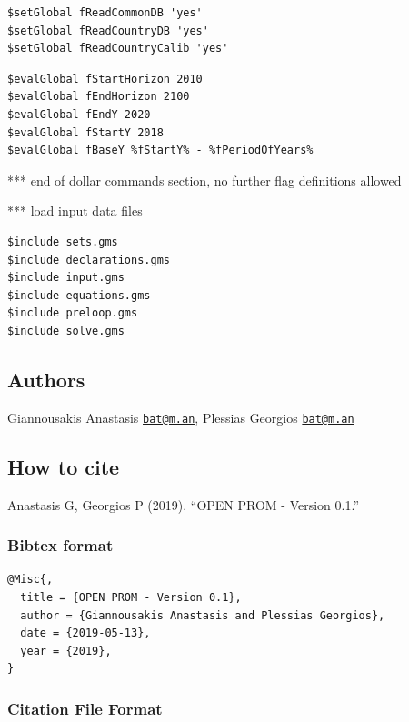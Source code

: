 \documentclass[a4paper,]{scrartcl}
\begin{document}
\begin{lstlisting}
$setGlobal fReadCommonDB 'yes'
$setGlobal fReadCountryDB 'yes'
$setGlobal fReadCountryCalib 'yes'
\end{lstlisting}

\begin{lstlisting}
$evalGlobal fStartHorizon 2010
$evalGlobal fEndHorizon 2100
$evalGlobal fEndY 2020
$evalGlobal fStartY 2018
$evalGlobal fBaseY %fStartY% - %fPeriodOfYears%
\end{lstlisting}

*** end of dollar commands section, no further flag definitions allowed

*** load input data files

\begin{lstlisting}
$include sets.gms
$include declarations.gms
$include input.gms
$include equations.gms
$include preloop.gms
$include solve.gms
\end{lstlisting}

\subsection{Authors}\label{authors}

Giannousakis Anastasis \href{mailto:bat@m.an}{\nolinkurl{bat@m.an}},
Plessias Georgios \href{mailto:bat@m.an}{\nolinkurl{bat@m.an}}

\subsection{How to cite}\label{how-to-cite}

Anastasis G, Georgios P (2019). ``OPEN PROM - Version 0.1.''

\subsubsection{Bibtex format}\label{bibtex-format}

\begin{lstlisting}
@Misc{,
  title = {OPEN PROM - Version 0.1},
  author = {Giannousakis Anastasis and Plessias Georgios},
  date = {2019-05-13},
  year = {2019},
}
\end{lstlisting}

\subsubsection{Citation File Format}\label{citation-file-format}
\end{document}
